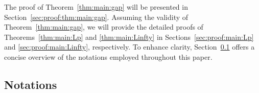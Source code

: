 \documentclass[nohyperref]{article}
\theoremstyle{plain}
\theoremstyle{definition}
\theoremstyle{remark}
\begin{document}
The proof of Theorem~\ref{thm:main:gap} will be presented in Section~\ref{sec:proof:thm:main:gap}.
Assuming the validity of Theorem~\ref{thm:main:gap}, we will provide the detailed proofs of  Theorems~\ref{thm:main:Lp} and \ref{thm:main:Linfty} in Sections~\ref{sec:proof:main:Lp} and \ref{sec:proof:main:Linfty}, respectively. 
To enhance clarity, Section~\ref{sec:notation} offers a concise overview of the notations employed throughout this paper.


\subsection{Notations}
\label{sec:notation}
\end{document}
